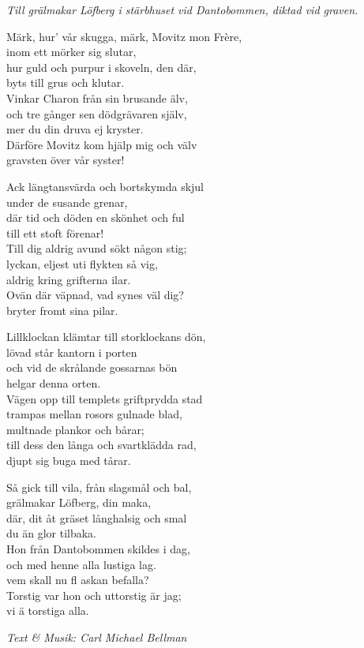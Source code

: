 {\footnotesize\textit{Till grälmakar Löfberg i stärbhuset vid Dantobommen, diktad vid graven.}}\par
\vspace{10pt}
Märk, hur' vår skugga, märk, Movitz mon Frère,\\
inom ett mörker sig slutar,\\
hur guld och purpur i skoveln, den där,\\
byts till grus och klutar.\\
Vinkar Charon från sin brusande älv,\\
och tre gånger sen dödgrävaren själv,\\
mer du din druva ej kryster.\\
Därföre Movitz kom hjälp mig och välv\\
gravsten över vår syster!\par
\vspace{10pt}
Ack längtansvärda och bortskymda skjul\\
under de susande grenar,\\
där tid och döden en skönhet och ful\\
till ett stoft förenar!\\
Till dig aldrig avund sökt någon stig;\\
lyckan, eljest uti flykten så vig,\\
aldrig kring grifterna ilar.\\
Ovän där väpnad, vad synes väl dig?\\
bryter fromt sina pilar.\par
\newpage
Lillklockan klämtar till storklockans dön,\\
lövad står kantorn i porten\\
och vid de skrålande gossarnas bön\\
helgar denna orten.\\
Vägen opp till templets griftprydda stad\\
trampas mellan rosors gulnade blad,\\
multnade plankor och bårar;\\
till dess den långa och svartklädda rad,\\
djupt sig buga med tårar.\par
\vspace{10pt}
Så gick till vila, från slagsmål och bal,\\
grälmakar Löfberg, din maka,\\
där, dit åt gräset långhalsig och smal\\
du än glor tilbaka.\\
Hon från Dantobommen skildes i dag,\\
och med henne alla lustiga lag.\\
vem skall nu fl askan befalla?\\
Torstig var hon och uttorstig är jag;\\
vi ä torstiga alla.\par
\vspace{10pt}
{\footnotesize\textit{Text \& Musik: Carl Michael Bellman}}
